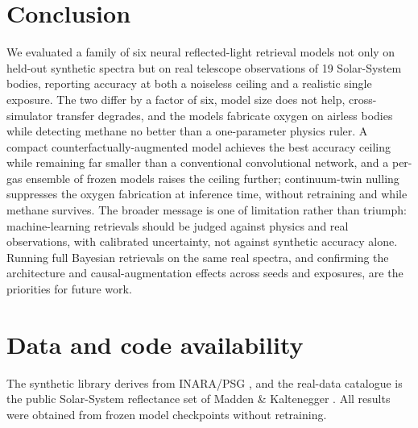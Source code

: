 \documentclass[11pt,twocolumn]{article}
\newcommand{\citep}[1]{\cite{#1}}
\begin{document}
\section{Conclusion}

We evaluated a family of six neural reflected-light retrieval models not only on
held-out synthetic spectra but on real telescope observations of 19 Solar-System
bodies, reporting accuracy at both a noiseless ceiling and a realistic single
exposure. The two differ by a factor of six, model size does not help,
cross-simulator transfer degrades, and the models fabricate oxygen on airless
bodies while detecting methane no better than a one-parameter physics ruler. A
compact counterfactually-augmented model achieves the best accuracy ceiling while
remaining far smaller than a conventional convolutional network, and a per-gas
ensemble of frozen models raises the ceiling further; continuum-twin nulling
suppresses the oxygen fabrication at inference time, without retraining and while
methane survives. The broader message is one of limitation rather than triumph:
machine-learning retrievals should be judged against physics and real
observations, with calibrated uncertainty, not against synthetic accuracy alone.
Running full Bayesian retrievals on the same real spectra, and confirming the
architecture and causal-augmentation effects across seeds and exposures, are the
priorities for future work.

\section*{Data and code availability}
\small
The synthetic library derives from INARA/PSG \citep{zorzan2025,villanueva2018},
and the real-data catalogue is the public Solar-System reflectance set of Madden
\& Kaltenegger \citep{madden2018}. All results were obtained from frozen model
checkpoints without retraining.
\end{document}
